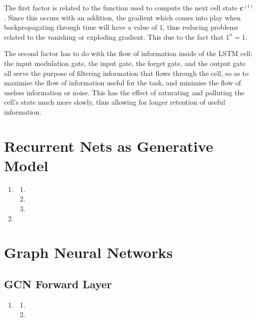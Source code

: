 \documentclass{article}
\begin{document}
\begin{enumerate}[label=\textbf{1.\arabic*}]
  The first factor is related to the function used to compute the next cell state $\mathbf{c}^{(t)}$. Since this occurs with an addition, the gradient which comes into play when backpropagating through time will have a value of $1$, thus reducing problems related to the vanishing or exploding gradient. This due to the fact that $1^n = 1$.

  The second factor has to do with the flow of information inside of the LSTM cell: the input modulation gate, the input gate, the forget gate, and the output gate all serve the purpose of filtering information that flows through the cell, so as to maximise the flow of information useful for the task, and minimise the flow of useless information or noise. This has the effect of saturating and polluting the cell's state much more slowly, thus allowing for longer retention of useful information.
\end{enumerate}

\section{Recurrent Nets as Generative Model}

\begin{enumerate}[label=\textbf{2.\arabic*}]
  \item

  \begin{enumerate}[label=\textbf{(\alph*)}]
    \item
    \item
    \item
  \end{enumerate}

  \item
\end{enumerate}

\section{Graph Neural Networks}

\subsection{GCN Forward Layer}

\begin{enumerate}[label=\textbf{3.\arabic*}]
  \item

  \begin{enumerate}[label=\textbf{(\alph*)}]
    \item
    \item
  \end{enumerate}
\end{enumerate}
\end{document}
